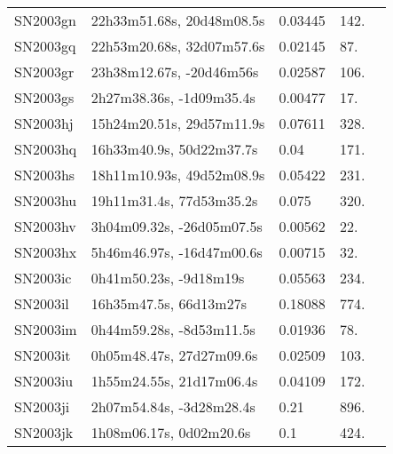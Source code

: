 \begin{longtable}{lllll}
         SN2003gn &      22h33m51.68s, 20d48m08.5s &  0.03445 &           142. &    \citet{1993AJ....105.1271G} \\
         SN2003gq &      22h53m20.68s, 32d07m57.6s &  0.02145 &            87. &    \citet{1991RC3.9.C...0000d} \\
         SN2003gr &       23h38m12.67s, -20d46m56s &  0.02587 &           106. &  \citet{2007AandA...465...71T} \\
         SN2003gs &       2h27m38.36s, -1d09m35.4s &  0.00477 &            17. &    \citet{2000MNRAS.313..469S} \\
         SN2003hj &      15h24m20.51s, 29d57m11.9s &  0.07611 &           328. &    \citet{2006SDSS5.C...0000:} \\
         SN2003hq &       16h33m40.9s, 50d22m37.7s &     0.04 &           171. &    \citet{2003IAUC.8192C...1C} \\
         SN2003hs &      18h11m10.93s, 49d52m08.9s &  0.05422 &           231. &    \citet{2004AJ....128.1558S} \\
         SN2003hu &       19h11m31.4s, 77d53m35.2s &    0.075 &           320. &    \citet{2003IAUC.8201A...1S} \\
         SN2003hv &      3h04m09.32s, -26d05m07.5s &  0.00562 &            22. &    \citet{2008AJ....135.2424O} \\
         SN2003hx &      5h46m46.97s, -16d47m00.6s &  0.00715 &            32. &  \citet{1998AandAS..130..333T} \\
         SN2003ic &         0h41m50.23s, -9d18m19s &  0.05563 &           234. &    \citet{2005AJ....130..968M} \\
         SN2003il &         16h35m47.5s, 66d13m27s &  0.18088 &           774. &    \citet{2001MNRAS.325.1571Z} \\
         SN2003im &       0h44m59.28s, -8d53m11.5s &  0.01936 &            78. &  \citet{1999AandAS..140..327M} \\
         SN2003it &       0h05m48.47s, 27d27m09.6s &  0.02509 &           103. &    \citet{2008AJ....135..588S} \\
         SN2003iu &       1h55m24.55s, 21d17m06.4s &  0.04109 &           172. &    \citet{1991RC3.9.C...0000d} \\
         SN2003ji &       2h07m54.84s, -3d28m28.4s &     0.21 &           896. &    \citet{2006AJ....131.1648B} \\
         SN2003jk &        1h08m06.17s, 0d02m20.6s &      0.1 &           424. &    \citet{2003IAUC.8237B...1C} \\

\end{longtable}
